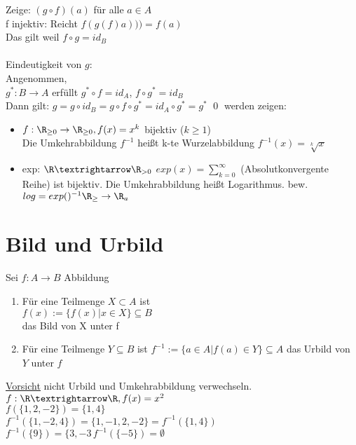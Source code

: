 %
Zeige: $(g \circ f) (a) $ für alle $a \in A$\\
f injektiv: Reicht $f(g(f)a))) = f(a)$\\
Das gilt weil $f \circ g = id_B$ \ok \\ \\
Eindeutigkeit von $g$:\\
Angenommen,\\
$g^* : B \to A$ erfüllt $g^* \circ f = id_A$,
$f \circ g^* = id_B$ \\
%
Dann gilt: $g=g\circ id_B=g\circ f\circ g^*=id_A\circ g^* = g^*$ \qed
\bsp
werden zeigen:\\
\begin{itemize}
\item{$f: \R_{\geq 0} \to \R_{\geq 0}, f(x) = x^k$ bijektiv ($k \geq 1$)\\
Die Umkehrabbildung $f^{-1}$ heißt k-te Wurzelabbildung $f^{-1}(x) = \sqrt[k]{x}$ }
%
\item{exp: $\R→\R_{>0}$ $exp(x) = \sum_{k=0}^{\infty}$ (Absolutkonvergente Reihe) ist bijektiv. Die Umkehrabbildung heißt Logarithmus. bew.
$log = exp()^{-1} \R_{\geq } \to \R_a$ }
\end{itemize}
%
\section*{Bild und Urbild}
Sei $f:A→B$ Abbildung\\
\begin{enumerate}
\item{Für eine Teilmenge $X \subset A$ ist \\
$f(x) := \{f(x) | x \in X\} \subseteq B$ \\
das Bild von X unter f}
\item{Für eine Teilmenge $Y \subseteq B$ ist $f^{-1}:=\{a\in A|f(a)\in Y\}\subseteq A$ das Urbild von $Y$ unter $f$}
\end{enumerate}
\underline{\underline{Vorsicht}} nicht Urbild und Umkehrabbildung verwechseln.\\
\bsp
$f:\R→\R, f(x)=x^2$\\
$f(\{1, 2, -2\}) = \{1, 4\}$\\
$f^{-1}(\{1,-2,4\})=\{1,-1,2,-2\}=f^{-1}(\{1,4\})$\\
$f^{-1}(\{9\})=\{3,-3\,f^{-1}(\{-5\})=\emptyset$\\
%
